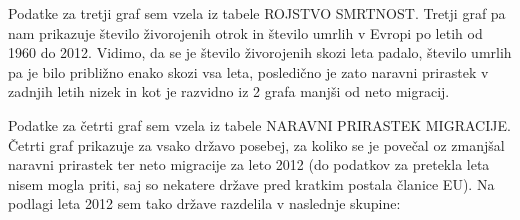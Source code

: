 \documentclass[11pt,a4paper]{article}
\begin{document}
Podatke za tretji graf sem vzela iz tabele ROJSTVO SMRTNOST.
Tretji graf pa nam prikazuje število živorojenih otrok in število umrlih v Evropi po letih od 1960 do 2012. Vidimo, da se je število živorojenih skozi leta padalo, število umrlih pa je bilo približno enako skozi vsa leta, posledično je zato naravni prirastek v zadnjih letih nizek in kot je razvidno iz 2 grafa manjši od neto migracij.



\newpage
Podatke za četrti graf sem vzela iz tabele NARAVNI PRIRASTEK MIGRACIJE.
Četrti graf prikazuje za vsako državo posebej, za koliko se je povečal oz zmanjšal naravni prirastek ter neto migracije za leto 2012 (do podatkov za pretekla leta nisem mogla priti, saj so nekatere države pred kratkim postala članice EU).
Na podlagi leta 2012 sem tako države razdelila v naslednje skupine:

\end{document}

